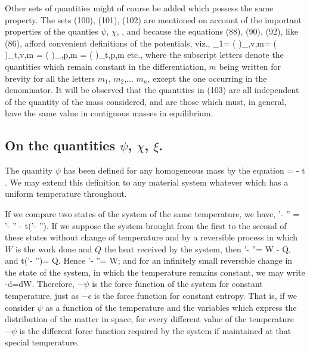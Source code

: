 \documentclass[12pt]{memoir}
\begin{document}
Other sets of quantities might of course be added which possess the same property. The sets (100), (101), (102) are mentioned on account of the important properties of the quanties $\psi$, $\chi$,  , and because the equations (88), (90), (92), like (86), afford convenient definitions of the potentials, viz.,
\eqs \mu_1= \left(  \right)_{\eta,v,m}=
\left(  \right)_{t,v,m} =
\left(  \right)_{\eta,p,m} =
\left(  \right)_{t,p,m}
\label{104}\eqe
etc., where the subscript letters denote the quantities which remain constant in the differentiation, $m$ being written for brevity for all the letters $m_1$, $m_2$,... $m_n$, except the one occurring in the denominator. It will be observed that the quantities in (103) are all independent of the quantity of the mass considered, and are those which must, in general, have the same value in contiguous masses in equilibrium.

\subsection{On the quantities $\psi$, $\chi$, $\xi$.}
The quantity $\psi$ has been defined for any homogeneous mass by the
equation
\eqs \psi = \epsilon - t \eta. \label{105}\eqe
We may extend this definition to any material system whatever which has a uniform temperature throughout.

If we compare two states of the system of the same temperature, we have,
\eqs \psi'- \psi'' = \epsilon'- \epsilon'' - t(\eta'- \eta''). \label{106}\eqe
If we suppose the system brought from the first to the second of these states without change of temperature and by a reversible process in which $W$ is the work done and $Q$ the heat received by the system, then
\eqs \epsilon'- \epsilon''= W - Q, \label{107}\eqe
and   \eqs         t(\eta'- \eta'')= Q. \label{108}\eqe
Hence  \eqs         \psi'- \psi''= W;  \label{109}\eqe
and for an infinitely small reversible change in the state of the system, in which the temperature remains constant, we may write
\eqs -d\psi=dW. \label{110}\eqe
Therefore, $-\psi$  is the force function of the system for constant temperature, just as $-\epsilon$ is the force function for constant entropy. That is, if we consider $\psi$ as a function of the temperature and the variables which express the distribution of the matter in space, for every different value of the temperature $-\psi$ is the different force function required by the system if maintained at that special temperature.
\end{document}
